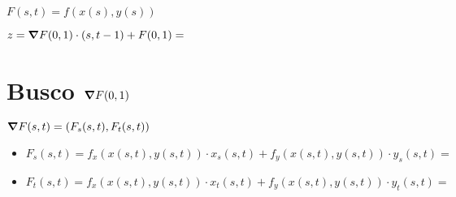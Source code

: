 \documentclass[../parcial.tex]{subfiles}
\begin{document}
    $F(s,t) = f(x(s),y(s))$

    $ z = \grad F(0,1)\cdot(s,t-1) + F(0,1) = $

    \section*{Busco $\grad F(0,1)$}

    $ \grad F(s,t) = (F_s(s,t), F_t(s,t)) $

    \begin{itemize}
        \item $ F_s(s,t) = f_x(x(s,t),y(s,t))\cdot x_s(s,t) + f_y(x(s,t), y(s,t))\cdot y_s(s,t) = $



        \item $ F_t(s,t) = f_x(x(s,t),y(s,t))\cdot x_t(s,t) + f_y(x(s,t), y(s,t))\cdot y_t(s,t) = $


    \end{itemize}
\end{document}
